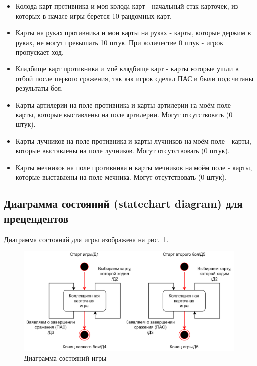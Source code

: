 \documentclass[12pt, a4paper, simple]{eskdtext}
\begin{document}
    \begin{itemize}
        \item Колода карт противника и моя колода карт - начальный стак карточек,
        из которых в начале игры берется 10 рандомных карт.
        \item Карты на руках противника и мои карты на руках - карты, которые держим в руках,
        не могут превышать 10 штук. При количестве 0 штук - игрок пропускает ход.
        \item Кладбище карт противника и моё кладбище карт - карты которые ушли в отбой после первого сражения,
        так как игрок сделал ПАС и были подсчитаны результаты боя.
        \item Карты артилерии на поле противника и карты артилерии на моём поле - карты,
        которые выставлены на поле артилерии.
        Могут отсутствовать (0 штук).
        \item Карты лучников на поле противника и карты лучников на моём поле - карты,
        которые выставлены на поле лучников.
        Могут отсутствовать (0 штук).
        \item Карты мечников на поле противника и карты мечников на моём поле - карты,
        которые выставлены на поле мечника.
        Могут отсутствовать (0 штук).
    \end{itemize}


    \newpage
    \subsection{Диаграмма состояний (statechart diagram) для прецендентов}

    Диаграмма состояний для игры изображена на рис.~\ref{fig:game__statechart_diagram}.

    \begin{figure}[!h]
        \centering
        \includegraphics[]
            {../sources/game_architecture/build/game__statechart_diagram.png}
        \caption{Диаграмма состояний игры}
        \label{fig:game__statechart_diagram}
    \end{figure}
\end{document}
